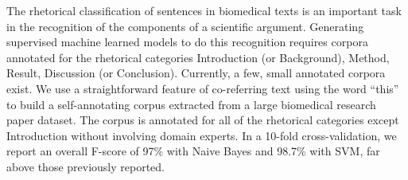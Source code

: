 The rhetorical classification of sentences in biomedical texts is an important task in the recognition of the components of a scientific argument. Generating supervised machine learned models to do this recognition requires corpora annotated for the rhetorical categories Introduction (or Background), Method, Result, Discussion (or Conclusion). Currently, a few, small annotated corpora exist. We use a straightforward feature of co-referring text using the word ``this'' to build a self-annotating corpus extracted from a large biomedical research paper dataset. The corpus is annotated for all of the rhetorical categories except Introduction without involving domain experts. In a 10-fold cross-validation, we report an overall F-score of 97\% with Naive Bayes and 98.7\% with SVM, far above those previously reported.
